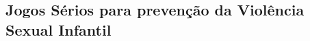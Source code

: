 

















\subsection{Jogos Sérios para prevenção da Violência Sexual Infantil}\label{ssec:JS}

